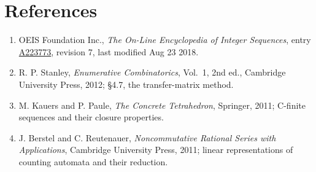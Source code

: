 \documentclass[11pt]{article}
\theoremstyle{definition}
\begin{document}
\section{References}

\begin{enumerate}

\item OEIS Foundation Inc., \emph{The On-Line Encyclopedia of Integer Sequences}, entry \href{https://oeis.org/A223773}{A223773}, revision 7, last modified Aug 23 2018.

\item R. P. Stanley, \emph{Enumerative Combinatorics}, Vol.~1, 2nd ed., Cambridge University Press, 2012; \S4.7, the transfer-matrix method.

\item M. Kauers and P. Paule, \emph{The Concrete Tetrahedron}, Springer, 2011; C-finite sequences and their closure properties.

\item J. Berstel and C. Reutenauer, \emph{Noncommutative Rational Series with Applications}, Cambridge University Press, 2011; linear representations of counting automata and their reduction.

\end{enumerate}
\end{document}

